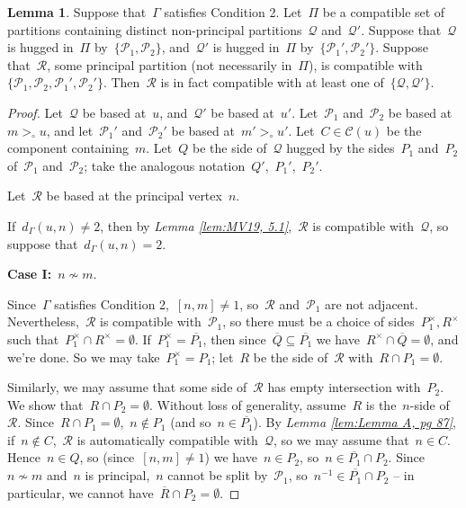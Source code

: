 \documentclass[11pt]{amsart}
\theoremstyle{definition}
\theoremstyle{definition}
\theoremstyle{definition}
\theoremstyle{definition}
\newtheorem{lemma}[theorem]{Lemma}
\newcommand{\calC}{\mathcal{C}}
\newcommand{\calQ}{\mathcal{Q}}
\newcommand{\calP}{\mathcal{P}} %
\newcommand{\calR}{\mathcal{R}} %
\begin{document}
\begin{lemma}\label{lem:condition 2 (NEW)}
    Suppose that~$\Gamma$ satisfies Condition 2. Let~$\Pi$ be a compatible set of partitions containing distinct non-principal partitions~$\calQ$ and~$\calQ'$. Suppose that~$\calQ$ is hugged in~$\Pi$ by~$\{\calP_1, \calP_2\}$, and~$\calQ'$ is hugged in~$\Pi$ by~$\{\calP_1', \calP_2'\}$. Suppose that~$\calR$, some principal partition (not necessarily in~$\Pi$), is compatible with~$\{\calP_1, \calP_2, \calP_1', \calP_2'\}$. Then~$\calR$ is in fact compatible with at least one of~$\{\calQ, \calQ'\}$. 
\end{lemma}

\begin{proof}
    Let~$\calQ$ be based at~$u$, and~$\calQ'$ be based at~$u'$. Let~$\calP_1$ and~$\calP_2$ be based at~$m >_\circ u$, and let~$\calP_1'$ and~$\calP_2'$ be based at~$m' >_\circ u'$. Let~$C \in \calC(u)$ be the component containing~$m$. Let~$Q$ be the side of~$\calQ$ hugged by the sides~$P_1$ and~$P_2$ of~$\calP_1$ and~$\calP_2$; take the analogous notation~$Q'$,~$P_1'$,~$P_2'$. 
    
    Let~$\calR$ be based at the principal vertex~$n$. 

    If~$d_\Gamma(u, n) \neq 2$, then by \emph{Lemma \ref{lem:MV19, 5.1}},~$\calR$ is compatible with~$\calQ$, so suppose that~$d_\Gamma(u, n) = 2$.

    \textbf{Case I:}~$n \not\sim m$.

    Since~$\Gamma$ satisfies Condition 2,~$[n, m] \neq 1$, so~$\calR$ and~$\calP_1$ are not adjacent. Nevertheless,~$\calR$ is compatible with~$\calP_1$, so there must be a choice of sides~$P_1^\times, R^\times$ such that~$P_1^\times \cap R^\times = \emptyset$. If~$P_1^\times = \overline{P_1}$, then since~$\overline{Q} \subseteq \overline{P_1}$ we have~$R^\times \cap \overline{Q} = \emptyset$, and we're done. So we may take~$P_1^\times = P_1$; let~$R$ be the side of~$\calR$ with~$R \cap P_1 = \emptyset$.
    
    Similarly, we may assume that some side of~$\calR$ has empty intersection with~$P_2$. We show that~$R \cap P_2 = \emptyset$. Without loss of generality, assume~$R$ is the~$n$-side of~$\calR$. Since~$R \cap P_1 = \emptyset$,~$n \notin P_1$ (and so~$n \in \overline{P_1}$). By \emph{Lemma \ref{lem:Lemma A, pg 87}}, if~$n \notin C$,~$\calR$ is automatically compatible with~$\calQ$, so we may assume that~$n \in C$. Hence~$n \in Q$, so (since~$[n, m] \neq 1$) we have~$n \in P_2$, so~$n \in \overline{P_1} \cap P_2$. Since~$n \not\sim m$ and~$n$ is principal,~$n$ cannot be split by~$\calP_1$, so~$n^{-1} \in \overline{P_1} \cap P_2$ -- in particular, we cannot have~$\overline{R} \cap P_2 = \emptyset$. 


\end{proof}
\end{document}
